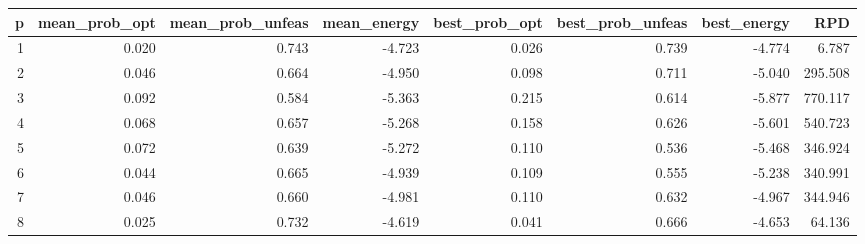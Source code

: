 \begin{tabular}{rrrrrrrr}
\toprule
p & mean_prob_opt & mean_prob_unfeas & mean_energy & best_prob_opt & best_prob_unfeas & best_energy & RPD \\
\midrule
1 & 0.020 & 0.743 & -4.723 & 0.026 & 0.739 & -4.774 & 6.787 \\
2 & 0.046 & 0.664 & -4.950 & 0.098 & 0.711 & -5.040 & 295.508 \\
3 & 0.092 & 0.584 & -5.363 & 0.215 & 0.614 & -5.877 & 770.117 \\
4 & 0.068 & 0.657 & -5.268 & 0.158 & 0.626 & -5.601 & 540.723 \\
5 & 0.072 & 0.639 & -5.272 & 0.110 & 0.536 & -5.468 & 346.924 \\
6 & 0.044 & 0.665 & -4.939 & 0.109 & 0.555 & -5.238 & 340.991 \\
7 & 0.046 & 0.660 & -4.981 & 0.110 & 0.632 & -4.967 & 344.946 \\
8 & 0.025 & 0.732 & -4.619 & 0.041 & 0.666 & -4.653 & 64.136 \\
\bottomrule
\end{tabular}
